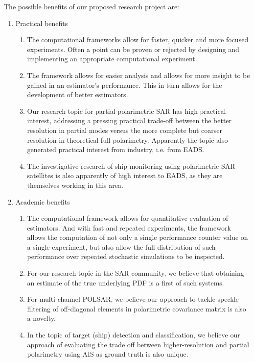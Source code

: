 The possible benefits of our proposed research project are:
\begin{enumerate}
\item Practical benefits
\begin{enumerate}
\item The computational frameworks allow for faster, quicker and more focused experiments. Often a point can be proven or rejected by designing and implementing an appropriate computational experiment.
\item The framework allows for easier analysis and allows for more insight to be gained in an estimator's performance. This in turn allows for the development of better estimators.
\item Our research topic for partial polarimetric SAR has high practical interest, addressing a pressing practical trade-off between the better resolution in partial modes versus the more complete but coarser resolution in theoretical full polarimetry.
Apparently the topic also generated practical interest from industry, i.e. from EADS.
\item The investigative research of ship monitoring using polarimetric SAR satellites is also apparently of high interest to EADS, as they are themselves working in this area.
\end{enumerate}
\item Academic benefits
\begin{enumerate}
\item The computational framework allows for quantitative evaluation of estimators.
And with fast and repeated experiments, the framework allows the computation of not only a single performance counter value on a single experiment, but also allow the full distribution of such performance over repeated stochastic simulations to be inspected.
\item For our research topic in the SAR community, we believe that obtaining an estimate of the true underlying PDF is a first of such systems.
\item For multi-channel POLSAR, we believe our approach to tackle speckle filtering of off-diagonal elements in polarimetric covariance matrix is also a novelty.
\item In the topic of target (ship) detection and classification, we believe our approach of evaluating the trade off between higher-resolution and partial polarimetry using AIS as ground truth is also unique.
\end{enumerate}
\end{enumerate}



